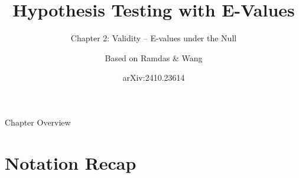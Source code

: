 \documentclass[aspectratio=169,10pt]{beamer}
\title[E-Values -- Ch.2]{Hypothesis Testing with E-Values}
\subtitle{Chapter 2: Validity -- E-values under the Null}
\author{Based on Ramdas \& Wang}
\date{arXiv:2410.23614}
\begin{document}
\begin{frame}
  \titlepage
\end{frame}

\begin{frame}{Chapter Overview}
  \tableofcontents
\end{frame}


\section{Notation Recap}
\end{document}
